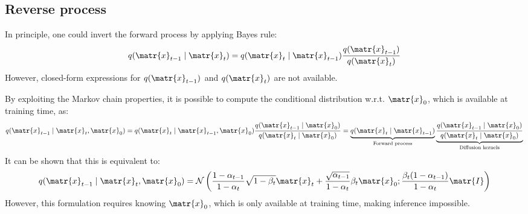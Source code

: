 \begin{description}
\end{description}


\subsection{Reverse process}

\begin{remark}
    In principle, one could invert the forward process by applying Bayes rule:
    \[ q(\matr{x}_{t-1} \mid \matr{x}_t) = q(\matr{x}_t \mid \matr{x}_{t-1}) \frac{q(\matr{x}_{t-1})}{q(\matr{x}_t)} \]
    However, closed-form expressions for $q(\matr{x}_{t-1})$ and $q(\matr{x}_{t})$ are not available.

    By exploiting the Markov chain properties, it is possible to compute the conditional distribution w.r.t. $\matr{x}_0$, which is available at training time, as:
    \[ 
        q(\matr{x}_{t-1} \mid \matr{x}_t, \matr{x}_0) = 
        q(\matr{x}_t \mid \matr{x}_{t-1}, \matr{x}_0) \frac{q(\matr{x}_{t-1} \mid \matr{x}_0)}{q(\matr{x}_t \mid \matr{x}_0)} = 
        \underbrace{{q(\matr{x}_t \mid \matr{x}_{t-1})}}_{\text{Forward process}}
        \underbrace{\frac{q(\matr{x}_{t-1} \mid \matr{x}_0)}{q(\matr{x}_t \mid \matr{x}_0)}}_{\text{Diffusion kernels}}
    \]
    It can be shown that this is equivalent to:
    \[ q(\matr{x}_{t-1} \mid \matr{x}_t, \matr{x}_0) = \mathcal{N}\left( \frac{1-\alpha_{t-1}}{1-\alpha_t}\sqrt{1-\beta_t}\matr{x}_t + \frac{\sqrt{\alpha_{t-1}}}{1-\alpha_t}\beta_t \matr{x}_0; \frac{\beta_t(1-\alpha_{t-1})}{1-\alpha_t} \matr{I} \right) \]
    However, this formulation requires knowing $\matr{x}_0$, which is only available at training time, making inference impossible.
\end{remark}

